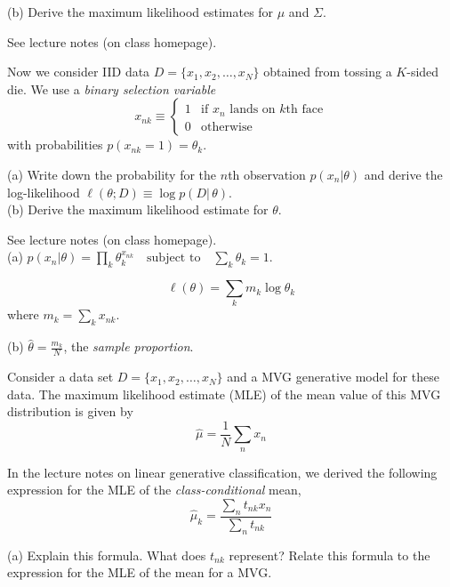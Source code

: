 \documentclass[a4paper]{article}
\begin{document}
\begin{ExerciseList}
(b) Derive the maximum likelihood estimates for $\mu$ and $\Sigma$.



\Answer[ref={ex:ML-MVG}]

See lecture notes (on class homepage).


\Exercise[label={ex:ML-Mult}]

Now we consider IID data $D = \{x_1,x_2,\ldots,x_N\}$ obtained from tossing a $K$-sided die. We use a \emph{binary selection variable}
$$x_{nk} \equiv \begin{cases} 1 & \text{if $x_n$ lands on $k$th face}\\
    0 & \text{otherwise}
\end{cases}
$$
with probabilities $p(x_{nk} = 1)=\theta_k$.
 
(a) Write down the probability for the $n$th observation $p(x_n|\theta)$ and derive the log-likelihood $\ell(\theta;D)\equiv \log p(D|\,\theta)$.\\

(b) Derive the maximum likelihood estimate for $\theta$.


\Answer[ref={ex:ML-Mult}]

See lecture notes (on class homepage). \\

(a) $p(x_n|\theta) = \prod_k \theta_k^{x_{nk}} \quad \text{subject to} \quad \sum_k \theta_k = 1$.

$$\ell(\theta)  = \sum_k m_k \log \theta_k$$
where $m_k = \sum_k x_{nk}$.


(b) $\hat \theta = \frac{m_k}{N}$, the \emph{sample proportion}.

\Exercise[label={ex:3}]
 Consider a data set $D=\{x_1,x_2,\dots,x_N\}$ and a MVG generative model for these data. The maximum likelihood estimate (MLE) of the mean value of this MVG distribution is given by
\begin{equation}\hat \mu = \frac{1}{N}\sum_n x_n \label{eq:mvg-mu} \end{equation}

In the lecture notes on linear generative classification, we derived the following expression for the MLE of the \emph{class-conditional} mean,
\begin{equation}
\hat \mu_k = \frac{\sum_n t_{nk} x_n}{\sum_n t_{nk}}
\label{eq:clas-mu}
\end{equation}

(a) Explain this formula. What does $t_{nk}$ represent? Relate this formula to the expression for the MLE of the mean for a MVG.\\


\end{ExerciseList}
\end{document}
